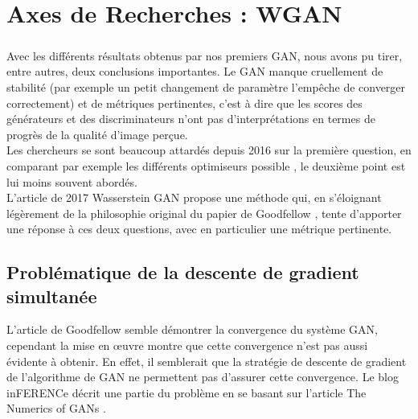 

\chapter{Axes de Recherches : WGAN}

\paragraph*{} Avec les différents résultats obtenus par nos premiers GAN, nous avons pu tirer, entre autres, deux conclusions importantes. Le GAN manque cruellement de stabilité (par exemple un petit changement de paramètre l'empêche de converger correctement) et de métriques pertinentes, c'est à dire que les scores des générateurs et des discriminateurs n'ont pas d'interprétations en termes de progrès de la qualité d'image perçue.\\
Les chercheurs se sont beaucoup attardés depuis 2016 sur la première question, en comparant par exemple les différents optimiseurs possible \cite{optimiser}, le deuxième point est lui moins souvent abordés. \\
L'article de 2017 Wasserstein GAN \cite{wgan} propose une méthode qui, en s'éloignant légèrement de la philosophie original du papier de Goodfellow \cite{Goodfellow-et-al-2016}, tente d'apporter une réponse à ces deux questions, avec en particulier une métrique pertinente.

\section{Problématique de la descente de gradient simultanée}

L'article de Goodfellow semble démontrer la convergence du système GAN, cependant la mise en œuvre montre que cette convergence n'est pas aussi évidente à obtenir. En effet, il semblerait que la stratégie de descente de gradient de l'algorithme de GAN ne permettent pas d'assurer cette convergence. Le blog inFERENCe \cite{conservative-field} décrit une partie du problème en se basant sur l'article The Numerics of GANs \cite{numerics-gan}.

